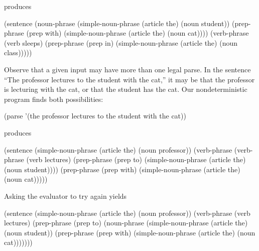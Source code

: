 \noindent
produces

\begin{codeBlock}
(sentence
 (noun-phrase
  (simple-noun-phrase (article the) (noun student))
  (prep-phrase
   (prep with)
   (simple-noun-phrase (article the) (noun cat))))
 (verb-phrase
  (verb sleeps)
  (prep-phrase
   (prep in)
   (simple-noun-phrase (article the) (noun class)))))
\end{codeBlock}

\noindent
Observe that a given input may have more than one legal parse.  In the sentence
``The professor lectures to the student with the cat,'' it may be that the
professor is lecturing with the cat, or that the student has the cat.  Our
nondeterministic program finds both possibilities:

\begin{codeBlock}
(parse '(the professor lectures to the student with the cat))
\end{codeBlock}

\noindent
produces

\begin{codeBlock}
(sentence
 (simple-noun-phrase (article the) (noun professor))
 (verb-phrase
  (verb-phrase
   (verb lectures)
   (prep-phrase
    (prep to)
    (simple-noun-phrase (article the) (noun student))))
  (prep-phrase
   (prep with)
   (simple-noun-phrase (article the) (noun cat)))))
\end{codeBlock}

\noindent
Asking the evaluator to try again yields

\begin{codeBlock}
(sentence
 (simple-noun-phrase (article the) (noun professor))
 (verb-phrase
  (verb lectures)
  (prep-phrase
   (prep to)
   (noun-phrase
    (simple-noun-phrase (article the) (noun student))
    (prep-phrase
     (prep with)
     (simple-noun-phrase (article the) (noun cat)))))))
\end{codeBlock}

